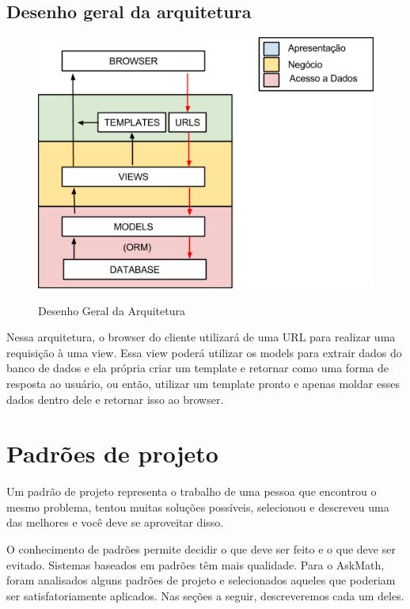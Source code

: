 \subsection{Desenho geral da arquitetura}
\begin{figure}[H]
\centering
\caption{Desenho Geral da Arquitetura}
\includegraphics[width=15cm]{figuras/figura_arquitetura.png}
\label{figura_arquitetura}
\end{figure}

Nessa arquitetura, o browser do cliente utilizar\'a de uma URL para realizar uma 
requisição \`a uma view. Essa view poder\'a utilizar os models para extrair dados do 
banco de dados e ela própria criar um template e retornar como uma forma 
de resposta ao usuário, ou então, utilizar um template pronto e apenas 
moldar esses dados dentro dele e retornar isso ao browser. 

\section{Padrões de projeto}
Um padrão de projeto representa o trabalho de uma pessoa que encontrou o mesmo 
problema, tentou muitas soluções possíveis, selecionou e descreveu uma das 
melhores e você deve se aproveitar disso.

O conhecimento de padrões permite decidir o que deve ser feito e o que deve ser 
evitado. Sistemas baseados em padrões têm mais qualidade. Para o AskMath, foram analisados alguns padrões  de projeto e selecionados aqueles que poderiam ser satisfatoriamente aplicados. Nas 
se\c{c}\~oes a seguir, descreveremos cada um deles.

